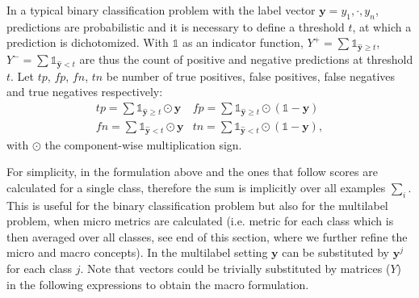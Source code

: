 In a typical binary classification problem with the label vector $\mathbf{y} = {y_1 , \cdot, y_n}$, predictions are probabilistic and it is necessary to define a threshold \(t\), at which a prediction is dichotomized. With \(\mathds{1}\) as an indicator function, \(Y^+ = \sum \mathds{1}_{\hat{\mathbf{y}} \geq t}\), \(Y^- = \sum \mathds{1}_{\hat{\mathbf{y}} < t}\) are thus the count of positive and negative predictions at threshold \(t\). Let \(tp\), \(fp\), \(fn\), \(tn\) be number of true positives, false positives, false negatives and true negatives respectively:
%
\begin{equation}
\label{eq:conf}
\begin{array}{ll}\mathit{tp} = \sum \mathds{1}_{\hat{\mathbf{y}} \geq t} \odot \mathbf{y}  & \mathit{fp} = \sum \mathds{1}_{\hat{\mathbf{y}} \geq t} \odot (\mathds{1} - \mathbf{y}) \\[.5em] \mathit{fn} = \sum \mathds{1}_{\hat{\mathbf{y}} < t} \odot \mathbf{y} & \mathit{tn} = \sum \mathds{1}_{\hat{\mathbf{y}} < t} \odot (\mathds{1} - \mathbf{y}),
\end{array}
\end{equation}
%
with \(\odot\) the component-wise multiplication sign.


For simplicity, in the formulation above and the ones that follow scores are calculated for a single class, therefore the sum is implicitly over all examples \(\sum_i\). This is useful for the binary classification problem but also for the multilabel problem, when micro metrics are calculated (i.e. metric for each class which is then averaged over all classes, see end of this section, where we further refine the micro and macro concepts). In the multilabel setting $\mathbf{y}$ can be substituted by $\mathbf{y}^j$ for each class $j$. Note that vectors could be trivially substituted by matrices ($Y$) in the following expressions to obtain the macro formulation.



